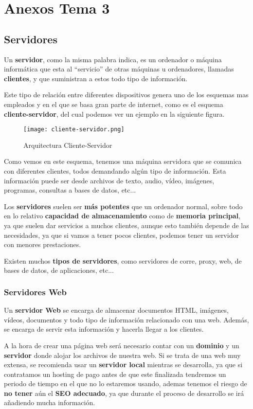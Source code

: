 \chapter{Anexos Tema 3}

\section{Servidores}
Un \textbf{servidor}, como la misma palabra indica, es un ordenador o máquina informática que esta al ``servicio'' de otras máquinas u ordenadores, llamadas \textbf{clientes}, y que suministran a estos todo tipo de información.

Este tipo de relación entre diferentes dispositivos genera uno de los esquemas mas empleados y en el que se basa gran parte de internet, como es el esquema \textbf{cliente-servidor}, del cual podemos ver un ejemplo en la siguiente figura.

\begin{figure}[H]
    \centering
    \texttt{[image: cliente-servidor.png]}
    \caption{Arquitectura Cliente-Servidor}
\end{figure}

Como vemos en este esquema, tenemos una máquina servidora que se comunica con diferentes clientes, todos demandando algún tipo de información. Esta información puede ser desde archivos de texto, audio, vídeo, imágenes, programas, consultas a bases de datos, etc...

Los \textbf{servidores} suelen ser \textbf{más potentes} que un ordenador normal, sobre todo en lo relativo  \textbf{capacidad de almacenamiento} como de \textbf{memoria principal}, ya que suelen dar servicios a muchos clientes, aunque esto también depende de las necesidades, ya que si vamos a tener pocos clientes, podemos tener un servidor con menores prestaciones.

Existen muchos \textbf{tipos de servidores}, como servidores de corre, proxy, web, de bases de datos, de aplicaciones, etc...

\subsection{Servidores Web}
Un \textbf{servidor Web} se encarga de almacenar documentos HTML, imágenes, vídeos, documentos y todo tipo de información relacionado con una web. Además, se encarga de servir esta información y hacerla llegar a los clientes.

A la hora de crear una página web será necesario contar con un \textbf{dominio} y un \textbf{servidor} donde alojar los archivos de nuestra web. Si se trata de una web muy extensa, se recomienda usar un \textbf{servidor local} mientras se desarrolla, ya que si contratamos un hosting de pago antes de que este finalizada tendremos un periodo de tiempo en el que no lo estaremos usando, ademas tenemos el riesgo de \textbf{no tener} aún el \textbf{SEO adecuado}, ya que durante el proceso de desarrollo se irá añadiendo mucha información.


